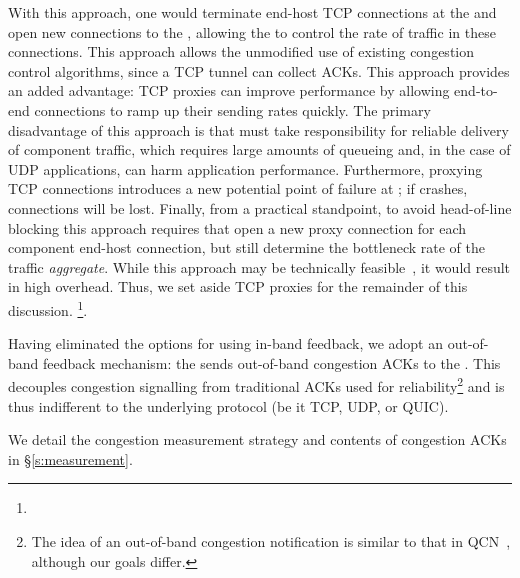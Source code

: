  With this approach, one would terminate end-host TCP connections at the \inbox and open new connections to the \outbox, allowing the \inbox to control the rate of traffic in these connections.
This approach allows the unmodified use of existing congestion control algorithms, since a TCP tunnel can collect ACKs. This approach provides an added advantage: TCP proxies can improve performance by allowing end-to-end connections to ramp up their sending rates quickly.  
The primary disadvantage of this approach is that \name must take responsibility for reliable delivery of component traffic, which requires large amounts of queueing and, in the case of UDP applications, can harm application performance. 
Furthermore, proxying TCP connections introduces a new potential point of failure at \name; if \name crashes, connections will be lost.
Finally, from a practical standpoint, to avoid head-of-line blocking this approach requires that \name open a new proxy connection for each component end-host connection, but still determine the bottleneck rate of the traffic \emph{aggregate}. While this approach may be technically feasible~\cite{cm}, it would result in high overhead. 
Thus, we set aside TCP proxies for the remainder of this discussion. 
\footnote{}.


 Having eliminated the options for using in-band feedback, we adopt an out-of-band feedback mechanism: the \outbox sends out-of-band congestion ACKs to the \inbox.
This decouples congestion signalling from traditional ACKs used for reliability\footnote{The idea of an out-of-band congestion notification is similar to that in QCN~\cite{qcn}, although our goals differ.} and is thus indifferent to the underlying protocol (be it TCP, UDP, or QUIC).

We detail the congestion measurement strategy and contents of congestion ACKs in \S\ref{s:measurement}.


